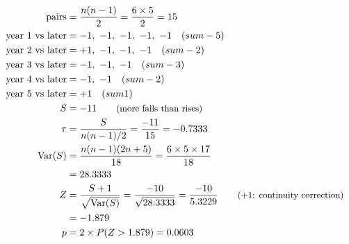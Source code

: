 \begin{align*}
\text{pairs} &= \frac{n(n-1)}{2} = \frac{6 \times 5}{2} = 15 \\
\text{year 1 vs later} &= -1,\ -1,\ -1,\ -1,\ -1 \quad (sum -5) \\
\text{year 2 vs later} &= +1,\ -1,\ -1,\ -1 \quad (sum -2) \\
\text{year 3 vs later} &= -1,\ -1,\ -1 \quad (sum -3) \\
\text{year 4 vs later} &= -1,\ -1 \quad (sum -2) \\
\text{year 5 vs later} &= +1 \quad (sum 1) \\
S &= -11 \qquad \text{\small (more falls than rises)} \\
\tau &= \frac{S}{n(n-1)/2} = \frac{-11}{15} = -0.7333 \\
\mathrm{Var}(S) &= \frac{n(n-1)(2n+5)}{18} = \frac{6 \times 5 \times 17}{18} \\
 &= 28.3333 \\
Z &= \frac{S + 1}{\sqrt{\mathrm{Var}(S)}} = \frac{-10}{\sqrt{28.3333}} = \frac{-10}{5.3229} \qquad \text{\small (+1: continuity correction)} \\
 &= -1.879 \\
p &= 2 \times P(Z > 1.879) = 0.0603
\end{align*}
